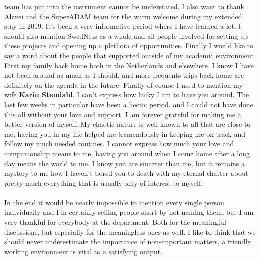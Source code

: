 team has put into the instrument cannot be understated. I also want to thank Alexei and the SuperADAM team for the warm welcome during my extended stay in 2019. It's been a very informative period where I have learned a lot. I should also mention SwedNess as a whole and all people involved for setting up these projects and opening up a plethora of opportunities. Finally I would like to say a word about the people that supported outside of my academic environment First my family back home both in the Netherlands and elsewhere. I know I have not been around as much as I should, and more frequents trips back home are definitely on the agenda in the future. Finally of course I need to mention my wife \textbf{Karin Stendahl}. I can't express how lucky I am to have you around. The last few weeks in particular have been a hectic period, and I could not have done this all without your love and support. I am forever grateful for making me a better version of myself. My chaotic nature is well known to all that are close to me, having you in my life helped me tremendously in keeping me on track and follow my much needed routines. I cannot express how much your love and companionship means to me, having you around when I come home after a long day means the world to me. I know you are smarter than me, but it remains a mystery to me how I haven't bored you to death with my eternal chatter about pretty much everything that is usually only of interest to myself. 
\\
\\
In the end it would be nearly impossible to mention every single person individually and I'm certainly selling people short by not naming them, but I am very thankful for everybody at the department. Both for the meaningful discussions, but especially for the meaningless ones as well. I like to think that we should never underestimate the importance of non-important matters, a friendly working environment is vital to a satisfying output.
